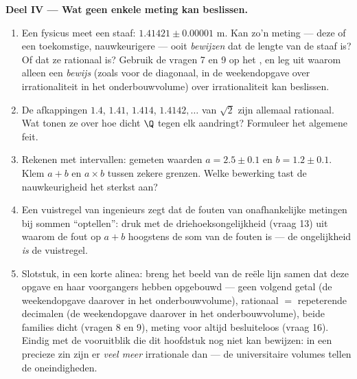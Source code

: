 \begin{problem}
\medskip
\noindent\textbf{Deel IV --- Wat geen enkele meting kan beslissen.}
\begin{enumerate}[resume]
  \item Een fysicus meet een staaf: $1.41421 \pm 0.00001$ m. Kan zo'n meting
        --- deze of een toekomstige, nauwkeurigere --- ooit \emph{bewijzen}
        dat de lengte van de staaf  is? Of dat ze rationaal is?
        Gebruik de vragen 7 en 9 op het , en leg uit
        waarom alleen een \emph{bewijs} (zoals voor de diagonaal, in de
        weekendopgave over irrationaliteit in het onderbouwvolume) over
        irrationaliteit kan beslissen.
  \item De afkappingen $1.4$, $1.41$, $1.414$, $1.4142,\dots$ van $\sqrt2$
        zijn allemaal rationaal. Wat tonen ze over hoe dicht $\Q$ tegen elk
         aandringt? Formuleer het algemene feit.
  \item Rekenen met intervallen: gemeten waarden $a = 2.5 \pm 0.1$ en
        $b = 1.2 \pm 0.1$. Klem $a + b$ en $a \times b$ tussen zekere
        grenzen. Welke bewerking tast de nauwkeurigheid het sterkst aan?
  \item Een vuistregel van ingenieurs zegt dat de fouten van onafhankelijke
        metingen bij sommen ``optellen'': druk met de
        driehoeksongelijkheid (vraag 13) uit waarom de fout op $a + b$
        hoogstens de som van de fouten is --- de ongelijkheid \emph{is} de
        vuistregel.
  \item Slotstuk, in een korte alinea: breng het beeld van de reële lijn
        samen dat deze opgave en haar voorgangers hebben opgebouwd --- geen
        volgend getal (de weekendopgave daarover in het onderbouwvolume),
        rationaal $=$ repeterende decimalen (de weekendopgave daarover in het
        onderbouwvolume), beide families dicht (vragen 8 en 9), meting voor
        altijd besluiteloos (vraag 16). Eindig met de vooruitblik die dit
        hoofdstuk nog niet kan bewijzen: in een precieze zin zijn er
        \emph{veel meer} irrationale dan  --- de
        universitaire volumes tellen de oneindigheden.
\end{enumerate}
\end{problem}
